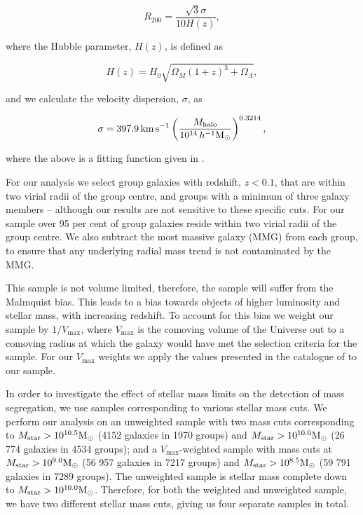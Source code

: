 \begin{equation}
  R_{200} = \frac{\sqrt{3} \sigma}{10 H(z)},
\end{equation}

\noindent
where the Hubble parameter, $H(z)$, is defined as

\begin{equation}
  H(z) = H_0\sqrt{\Omega_M (1+z)^3 + \Omega_\Lambda},
\end{equation}

\noindent
and we calculate the velocity dispersion, $\sigma$, as

\begin{equation}
  \sigma = 397.9\,\mathrm{km}\,\mathrm{s^{-1}} \left
(\frac{M_\mathrm{halo}}{10^{14}\,h^{-1}\mathrm{M_{\odot}}} \right )^{0.3214},
\end{equation}

\noindent
where the above is a fitting function given in \citet{yang2007}.
\par
For our analysis we select group galaxies with redshift, $z < 0.1$,
that are within two virial radii of the group centre, and groups with
a minimum of three galaxy members -- although our results are not
sensitive to these specific cuts.  For our sample over 95 per cent of
group galaxies reside within two virial radii of the group centre.  We
also subtract the most massive galaxy (MMG) from each group, to ensure
that any underlying radial mass trend is not contaminated by the MMG.
\par
This sample is not volume limited, therefore, the sample will suffer
from the Malmquist bias.  This leads to a bias towards objects of
higher luminosity and stellar mass, with increasing redshift.  To
account for this bias we weight our sample by $1/V_\mathrm{max}$,
where $V_\mathrm{max}$ is the comoving volume of the Universe out to a
comoving radius at which the galaxy would have met the selection
criteria for the sample.  For our $V_\mathrm{max}$ weights we apply
the values presented in the catalogue of \citet{simard2011} to our
sample.
\par
In order to investigate the effect of stellar mass limits on the
detection of mass segregation, we use samples corresponding to various
stellar mass cuts.  We perform our analysis on an unweighted sample
with two mass cuts corresponding to $M_\mathrm{star} > 10^{10.5}\mathrm{M_{\odot}}$
(4152 galaxies in 1970 groups) and $M_\mathrm{star} > 10^{10.0}\mathrm{M_{\odot}}$
(26 774 galaxies in 4534 groups); and a $V_\mathrm{max}$-weighted
sample with mass cuts at $M_\mathrm{star} > 10^{9.0}\mathrm{M_{\odot}}$
(56 957 galaxies in 7217 groups) and $M_\mathrm{star} > 10^{8.5}\mathrm{M_{\odot}}$
(59 791 galaxies in 7289 groups).  The unweighted sample is stellar
mass complete down to $M_\mathrm{star} > 10^{10.0}\mathrm{M_{\odot}}$.  Therefore,
for both the weighted and unweighted sample, we have two different
stellar mass cuts, giving us four separate samples in total.

